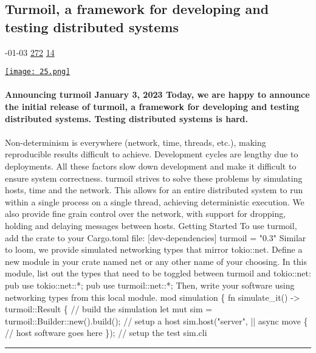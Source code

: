 \documentclass[10pt,a4paper]{article}
\begin{document}
\begin{multicols*}{2}
\begin{minipage}{\linewidth}
\subsection{Turmoil, a framework for developing and testing distributed systems}
\textsc{\footnotesize
{\scriptsize\faCalendar}-01-03 
{\scriptsize\faThumbsOUp}\space 
\href{http://news.ycombinator.com/item?id=37163187\&utm\_term=comment}{272} 
{\scriptsize\faComments}\space 
\href{http://news.ycombinator.com/item?id=37163187\&utm\_term=comment}{14} 
}
\par\medskip\noindent
\href{https://tokio.rs/blog/2023-01-03-announcing-turmoil?utm\_source=hackernewsletter\&utm\_medium=email\&utm\_term=code}{
    \texttt{[image: 25.png]}
}
\end{minipage}
\paragraph{}
\textbf{Announcing turmoil
January 3, 2023
Today, we are happy to announce the initial release of
turmoil,
a framework for developing and testing distributed systems.
Testing distributed systems is hard.}
\paragraph{}
 Non-determinism is everywhere (network, time, threads, etc.), making reproducible results difficult to achieve. Development cycles are lengthy due to deployments. All these factors slow down development and make it difficult to ensure system correctness.
turmoil strives to solve these problems by simulating hosts, time and the
network. This allows for an entire distributed system to run within a single
process on a single thread, achieving deterministic execution. We also provide
fine grain control over the network, with support for dropping, holding and
delaying messages between hosts.
Getting Started
To use
turmoil, add the crate to your
Cargo.toml file:
[dev-dependencies] turmoil = "0.3"
Similar to
loom, we provide simulated networking types that mirror
tokio::net. Define a new module in your crate named
net or any other name of
your choosing. In this module, list out the types that need to be toggled
between
turmoil and
tokio::net:
pub use tokio::net::*; pub use turmoil::net::*;
Then, write your software using networking types from this local module.
mod simulation \{ fn simulate\_it() -> turmoil::Result \{ // build the simulation let mut sim = turmoil::Builder::new().build(); // setup a host sim.host("server", || async move \{ // host software goes here \}); // setup the test sim.cli
\par\noindent\textcolor{red}{\rule{\linewidth}{0.2mm}}
\vfill
\null
\noindent\begin{minipage}{\linewidth}

\end{minipage}
\end{multicols*}
\end{document}
